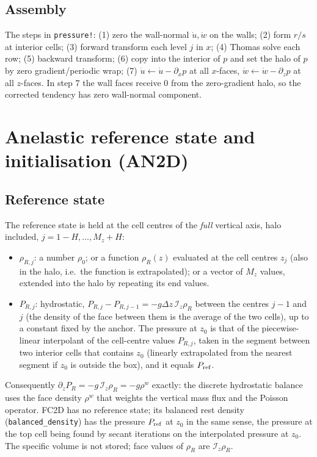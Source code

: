 \documentclass[11pt,a4paper]{article}
\newcommand{\code}[1]{\texttt{#1}}
\newcommand{\Iz}{\mathcal{I}_z}
\begin{document}
\subsection{Assembly}
The steps in \code{pressure!}: (1) zero the wall-normal $\dot u,\dot w$ on the walls; (2) form $r/s$ at interior cells; (3) forward transform each level $j$ in $x$; (4) Thomas solve each row; (5) backward transform;
(6) copy into the interior of $p$ and set the halo of $p$ by zero gradient/periodic wrap; (7) $\dot u\leftarrow\dot u-\partial_xp$ at all $x$-faces, $\dot w\leftarrow\dot w-\partial_zp$ at all $z$-faces.
In step 7 the wall faces receive $0$ from the zero-gradient halo, so the corrected tendency has zero wall-normal component.

\section{Anelastic reference state and initialisation (AN2D)}\label{sec:ref}
\subsection{Reference state}
The reference state is held at the cell centres of the \emph{full} vertical axis, halo included, $j=1-H,\dots,M_z+H$:
\begin{itemize}
  \item $\rho_{R,j}$: a number $\rho_0$; or a function $\rho_R(z)$ evaluated at the cell centres $z_j$ (also in the halo, i.e.\ the function is extrapolated); or a vector of $M_z$ values, extended into the halo by repeating its end values.
  \item $P_{R,j}$: hydrostatic, $P_{R,j}-P_{R,j-1}=-g\Delta z\,\Iz\rho_R$ between the centres $j-1$ and $j$ (the density of the face between them is the average of the two cells), up to a constant fixed by the anchor. The pressure at $z_0$ is that of the piecewise-linear interpolant of the cell-centre values $P_{R,j}$, taken in the segment between two interior cells that contains $z_0$ (linearly extrapolated from the nearest segment if $z_0$ is outside the box), and it equals $P_{\rm ref}$.
\end{itemize}
Consequently $\partial_zP_R=-g\,\Iz\rho_R=-g\rho^w$ exactly: the discrete hydrostatic balance uses the face density $\rho^w$ that weights the vertical mass flux and the Poisson operator. FC2D has no reference state; its balanced rest density (\code{balanced\_density}) has the pressure $P_{\rm ref}$ at $z_0$ in the same sense, the pressure at the top cell being found by secant iterations on the interpolated pressure at $z_0$.
The specific volume is not stored; face values of $\rho_R$ are $\Iz\rho_R$.
\end{document}
